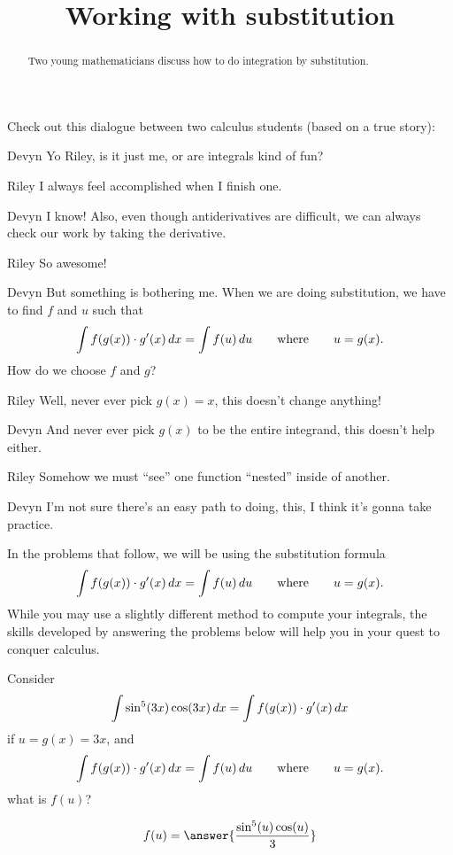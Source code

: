 \documentclass{ximera}
\title[Break-Ground:]{Working with substitution}
\begin{document}
\begin{abstract}
Two young mathematicians discuss how to do integration by
substitution.
\end{abstract}
\maketitle

Check out this dialogue between two calculus students (based on a true
story):

\begin{dialogue}
\item[Devyn] Yo Riley, is it just me, or are integrals kind of fun?
\item[Riley] I always feel accomplished when I finish one.
\item[Devyn] I know! Also, even though antiderivatives are difficult,
  we can always check our work by taking the derivative.
\item[Riley] So awesome!
\item[Devyn] But something is bothering me. When we are doing substitution,
  we have to find $f$ and $u$ such that
  \[
  \int f(g(x)) \cdot g'(x) \,d x = \int f(u) \,d u\qquad\text{where}\qquad u = g(x).
  \]
  How do we choose $f$ and $g$?
\item[Riley] Well, never ever pick $g(x) = x$, this doesn't change
    anything!
\item[Devyn] And never ever pick $g(x)$ to be the entire integrand,
  this doesn't help either.
\item[Riley] Somehow we must ``see'' one function ``nested'' inside of
  another.
\item[Devyn] I'm not sure there's an easy path to doing, this, I think
  it's gonna take practice.
\end{dialogue}


In the problems that follow, we will be using the substitution formula
\[
   \int f(g(x)) \cdot g'(x) \,d x = \int f(u) \,d
   u\qquad\text{where}\qquad u = g(x).
\]
While you may use a slightly different method to compute your
integrals, the skills developed by answering the problems below will
help you in your quest to conquer calculus.

\begin{problem}
  Consider
  \[
  \int \sin^5(3x) \cos(3x) \,d x = \int f(g(x)) \cdot g'(x) \,d x
  \]
  if $u = g(x) = 3x$, and 
  \[
  \int f(g(x)) \cdot g'(x) \,d x = \int f(u) \,d
  u\qquad\text{where}\qquad u = g(x).
  \]
  what is $f(u)$?
  \begin{prompt}
    \[
    f(u) = \answer{
      \frac{\sin^5(u) \cos(u)}{3}}
    \]
  \end{prompt}
\end{problem}
\end{document}
